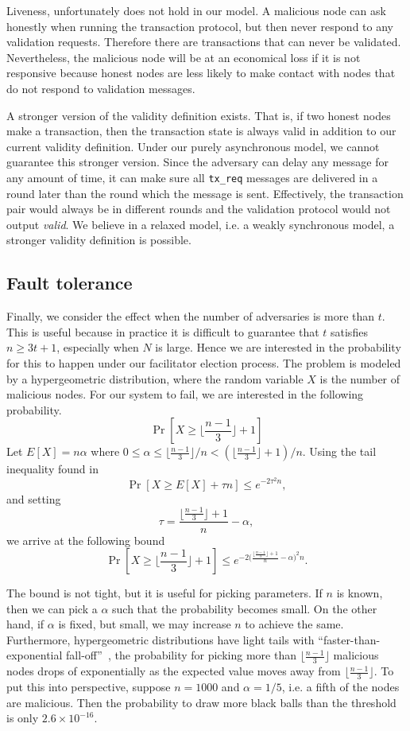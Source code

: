 Liveness, unfortunately does not hold in our model.
A malicious node can ask honestly when running the transaction protocol,
but then never respond to any validation requests.
Therefore there are transactions that can never be validated.
Nevertheless, the malicious node will be at an economical loss if it is not responsive because honest nodes are less likely to make contact with nodes that do not respond to validation messages.

A stronger version of the validity definition exists.
That is, if two honest nodes make a transaction,
then the transaction state is always valid in addition to our current validity definition.
Under our purely asynchronous model, we cannot guarantee this stronger version.
Since the adversary can delay any message for any amount of time,
it can make sure all \texttt{tx\_req} messages are delivered in a round later than the round which the message is sent.
Effectively, the transaction pair would always be in different rounds and the validation protocol would not output \emph{valid}.
We believe in a relaxed model, i.e. a weakly synchronous model, a stronger validity definition is possible.

\subsection{Fault tolerance}
Finally, we consider the effect when the number of adversaries is more than $t$.
This is useful because in practice it is difficult to guarantee that $t$ satisfies $n \ge 3t + 1$,
especially when $N$ is large.
Hence we are interested in the probability for this to happen under our facilitator election process.
The problem is modeled by a hypergeometric distribution,
where the random variable $X$ is the number of malicious nodes.
For our system to fail, we are interested in the following probability.
$$
\Pr[X \ge \lfloor \frac{n-1}{3} \rfloor + 1]
$$
Let $E[X] = n\alpha$ where $0 \le \alpha \le \lfloor \frac{n-1}{3} \rfloor/n < (\lfloor  \frac{n - 1}{3} \rfloor + 1) / n$.
Using the tail inequality found in~\cite{skala2013hypergeometric}
$$
\Pr[X \ge E[X] + \tau n] \le e^{-2\tau^2n},
$$
and setting 
$$
\tau = \frac{\lfloor \frac{n-1}{3} \rfloor + 1}{n} - \alpha,
$$
we arrive at the following bound
$$
\Pr[X \ge \lfloor \frac{n-1}{3} \rfloor + 1] \le e^{-2 \big(\frac{\lfloor  \frac{n - 1}{3} \rfloor + 1}{n} - \alpha \big)^2 n}.
$$

The bound is not tight, but it is useful for picking parameters.
If $n$ is known, then we can pick a $\alpha$ such that the probability becomes small.
On the other hand, if $\alpha$ is fixed, but small, we may increase $n$ to achieve the same.
Furthermore, hypergeometric distributions have light tails with ``faster-than-exponential fall-off''~\cite{skala2013hypergeometric},
the probability for picking more than $\lfloor \frac{n-1}{3} \rfloor$ malicious nodes drops of exponentially as the expected value moves away from $\lfloor \frac{n-1}{3} \rfloor$.
To put this into perspective,
suppose $n = 1000$ and $\alpha = 1/5$, i.e. a fifth of the nodes are malicious.
Then the probability to draw more black balls than the threshold is only $2.6 \times 10^{-16}$.



